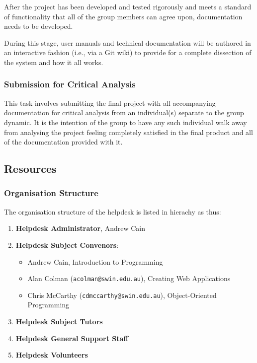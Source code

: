\documentclass[a4paper,12pt]{article}
\providecommand{\tightlist}{%
  \setlength{\itemsep}{0pt}\setlength{\parskip}{0pt}}
\begin{document}
After the project has been developed and tested rigorously and meets a
standard of functionality that all of the group members can agree upon,
documentation needs to be developed.

During this stage, user manuals and technical documentation will be
authored in an interactive fashion (i.e., via a Git wiki) to provide for
a complete dissection of the system and how it all works.

\subsubsection{Submission for Critical
Analysis}\label{submission-for-critical-analysis}

This task involves submitting the final project with all accompanying
documentation for critical analysis from an individual(s) separate to
the group dynamic. It is the intention of the group to have any such
individual walk away from analysing the project feeling completely
satisfied in the final product and all of the documentation provided
with it.

\subsection{Resources}\label{resources}

\subsubsection{Organisation Structure}\label{organisation-structure}

The organisation structure of the helpdesk is listed in hierachy as
thus:

\begin{enumerate}
\tightlist
\def\labelenumi{\arabic{enumi}.}
\item
  \textbf{Helpdesk Administrator}, Andrew Cain
\item
  \textbf{Helpdesk Subject Convenors}:

\begin{itemize}
\tightlist
\item
  Andrew Cain, Introduction to Programming
\item
  Alan Colman (\texttt{acolman@swin.edu.au}), Creating Web Applications
\item
  Chris McCarthy (\texttt{cdmccarthy@swin.edu.au}), Object-Oriented
  Programming
\end{itemize}

\def\labelenumi{\arabic{enumi}.}
\setcounter{enumi}{2}
\item
  \textbf{Helpdesk Subject Tutors}
\item
  \textbf{Helpdesk General Support Staff}
\item
  \textbf{Helpdesk Volunteers}
\end{enumerate}
\end{document}
